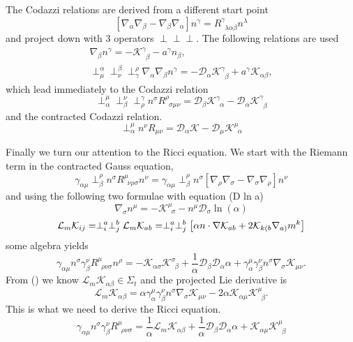 The Codazzi relations are derived from a different start point
$$  [\nabla_\alpha\nabla_\beta-\nabla_\beta\nabla_\alpha]n^\gamma = {R}^\gamma_{\,\,\,\lambda \alpha\beta}n^\lambda $$
and project down with 3 operators $\perp\perp\perp$. The following relations are used 
\begin{gather*} \nabla_\beta n^\gamma = -\mathcal{K}^\gamma_{\,\,\,\beta} - a^\gamma n_\beta,\\
 \perp^\alpha_\mu \perp^\beta_\nu \perp^\rho_\gamma \nabla_\alpha \nabla_\beta n^\gamma = -\mathcal{D}_\alpha \mathcal{K}^\gamma_{\,\,\,\beta} + a^\gamma \mathcal{K}_{\alpha\beta},\end{gather*}
which lead immediately to the Codazzi relation
\begin{equation}\perp_\alpha^\mu \perp_\beta^\nu \perp^\gamma_\rho n^\sigma R^\rho_{\,\,\,\sigma\mu\nu} =  \mathcal{D}_\beta \mathcal{K}^\gamma_{\,\,\,\alpha} -\mathcal{D}_\alpha \mathcal{K}^\gamma_{\,\,\,\beta}\end{equation}
and the contracted Codazzi relation.
\begin{equation}\perp^\mu_\alpha  n^\nu R_{\mu\nu} =  \mathcal{D}_\alpha \mathcal{K} -\mathcal{D}_\mu \mathcal{K}^\mu_{\,\,\,\alpha}\end{equation}


Finally we turn our attention to the Ricci equation. We start with the Riemann term in the contracted Gauss equation,
\begin{equation}\gamma_{\alpha\mu}\perp^\rho_\beta n^\sigma R^\mu_{\,\,\,\nu\rho\sigma}n^\nu =
\gamma_{\alpha\mu}\perp^\rho_\beta n^\sigma\left[ \nabla_\rho\nabla_\sigma-\nabla_\sigma\nabla_\rho\right]n^\nu\end{equation}
and using the following two formulae with equation (D ln a)
\begin{equation} \nabla_\sigma n^\mu = -\mathcal{K}^\mu_{\,\,\,\sigma}-n^\mu \mathcal{D}_\sigma \ln(\alpha)\end{equation}
\begin{equation} \mathcal{L}_m \mathcal{K}_{ij}  = \perp^a_i\perp^b_j\mathcal{L}_m \mathcal{K}_{ab} =\perp^a_i\perp^b_j\left[ \alpha n\cdot \nabla \mathcal{K}_{ab} + 2 \mathcal{K}_{k(b}\nabla_{a)}m^k\right] \end{equation}
some algebra yields
$$  \gamma_{\alpha\mu}n^\sigma \gamma^\nu_\beta R^\mu_{\,\,\,\rho\nu\sigma} n^\rho = -\mathcal{K}_{\alpha\sigma}\mathcal{K}^\sigma_{\,\,\,\beta} +\frac{1}{\alpha}\mathcal{D}_\beta\mathcal{D}_\alpha \alpha + \gamma^\mu_\alpha\gamma^\nu_\beta n^\sigma \nabla_\sigma \mathcal{K}_{\mu\nu}.$$
From () we know $\mathcal{L}_m\mathcal{K}_{\alpha\beta} \in \Sigma_t$ and the projected Lie derivative is
$$  \mathcal{L}_m\mathcal{K}_{\alpha\beta} = \alpha \gamma^\mu_\alpha \gamma^\nu_\beta n^\sigma \nabla_\sigma \mathcal{K}_{\mu\nu} - 2\alpha\mathcal{K}_{\alpha\mu}\mathcal{K}^\mu_{\,\,\,\beta}.$$
This is what we need to derive the Ricci equation.
\begin{equation}\gamma_{\alpha\mu}n^\sigma \gamma^\nu_\beta R^\mu_{\,\,\,\rho\nu\sigma} = \frac{1}{\alpha}\mathcal{L}_m \mathcal{K}_{\alpha\beta} +\frac{1}{\alpha}\mathcal{D}_\beta\mathcal{D}_\alpha \alpha +\mathcal{K}_{\alpha\mu}\mathcal{K}^\mu_{\,\,\,\beta}  \end{equation}

